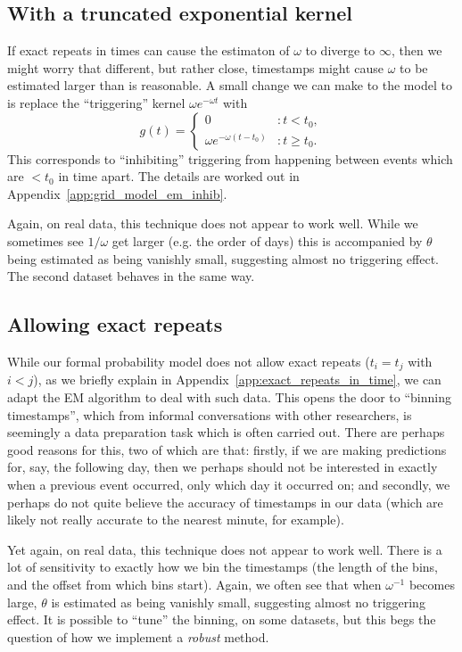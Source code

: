 \documentclass[twoside,a4paper]{article}
\theoremstyle{plain}
\theoremstyle{definition}
\begin{document}
\subsection{With a truncated exponential kernel}

If exact repeats in times can cause the estimaton of $\omega$ to diverge to $\infty$,
then we might worry that different, but rather close, timestamps might cause $\omega$ to
be estimated larger than is reasonable.  A small change we can make to the model to is
replace the ``triggering'' kernel $\omega e^{-\omega t}$ with 
\[ g(t) = \begin{cases} 0 &: t<t_0, \\ \omega e^{-\omega(t-t_0)} &: t\geq t_0.
\end{cases} \]
This corresponds to ``inhibiting'' triggering from happening between events which are
$<t_0$ in time apart.  The details are worked out in Appendix~\ref{app:grid_model_em_inhib}.

Again, on real data, this technique does not appear to work well.  While we sometimes
see $1/\omega$ get larger (e.g. the order of days) this is accompanied by $\theta$ being
estimated as being vanishly small, suggesting almost no triggering effect.
The second dataset behaves in the same way.



\subsection{Allowing exact repeats}\label{sec:exact_repeats}

While our formal probability model does not allow exact repeats ($t_i=t_j$ with $i<j$),
as we briefly explain in Appendix~\ref{app:exact_repeats_in_time}, we can adapt the EM
algorithm to deal with such data.  This opens the door to ``binning timestamps'', which
from informal conversations with other researchers, is seemingly a data preparation task
which is often carried out.  There are perhaps good reasons for this, two of which are
that: firstly, if we are making predictions for, say, the following day, then we perhaps
should not be interested in exactly when a previous event occurred, only which day it
occurred on; and secondly, we perhaps do not quite believe the accuracy of timestamps in
our data (which are likely not really accurate to the nearest minute, for example).

Yet again, on real data, this technique does not appear to work well.  There is a lot of
sensitivity to exactly how we bin the timestamps (the length of the bins, and the offset
from which bins start).  Again, we often see that when $\omega^{-1}$ becomes large,
$\theta$ is estimated as being vanishly small, suggesting almost no triggering effect.
It is possible to ``tune'' the binning, on some datasets, but this begs the question of
how we implement a \emph{robust} method.
\end{document}
